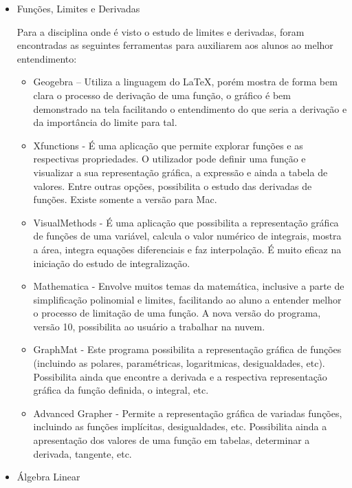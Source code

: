 \documentclass[12pt,a4paper]{article}
\begin{document}
\begin{itemize}
\begin{itemize}
\end{itemize}

\item Funções, Limites e Derivadas

Para a disciplina onde é visto o estudo de limites e derivadas, foram encontradas as seguintes ferramentas para auxiliarem aos alunos ao melhor entendimento:
\begin{itemize}
\item  Geogebra – Utiliza a linguagem do LaTeX, porém mostra de forma bem clara o processo de derivação de uma função, o gráfico é bem demonstrado na tela facilitando o entendimento do que seria a derivação e da importância do limite para tal.


\item Xfunctions - É uma aplicação que permite explorar funções e as respectivas propriedades. O utilizador pode definir uma função e visualizar a sua representação gráfica, a expressão e ainda a tabela de valores. Entre outras opções, possibilita o estudo das derivadas de funções. Existe somente a versão para Mac.

\item VisualMethods - É uma aplicação que possibilita a representação gráfica de funções de uma variável, calcula o valor numérico de integrais, mostra a área, integra equações diferenciais e faz interpolação. É muito eficaz na iniciação do estudo de integralização.

\item Mathematica - Envolve muitos temas da matemática, inclusive a parte de simplificação polinomial e limites, facilitando ao aluno a entender melhor o processo de limitação de uma função. A nova versão do programa, versão 10, possibilita ao usuário a trabalhar na nuvem.

\item GraphMat - Este programa possibilita a representação gráfica de funções (incluindo as polares, paramétricas, logaritmicas, desigualdades, etc). Possibilita ainda que encontre a derivada e a respectiva representação gráfica da função definida, o integral, etc.

\item Advanced Grapher - Permite a representação gráfica de variadas funções, incluindo as funções implícitas, desigualdades, etc. Possibilita ainda a apresentação dos valores de uma função em tabelas, determinar a derivada, tangente, etc.
\end{itemize}
\item Álgebra Linear


\end{itemize}
\end{document}

